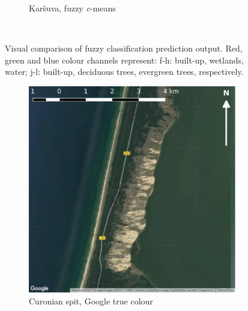 \documentclass[a4paper,12pt]{scrbook}
\begin{document}
\begin{figure}
\begin{subfigure}[t]{.24\textwidth}
    \caption{Kar\v{s}uva, fuzzy \textit{c}-means}
    \label{subfig-karsuva-cm}
  \end{subfigure} \
  \caption{Visual comparison of fuzzy classification prediction output. Red, green and blue colour channels represent: f-h: built-up, wetlands, water; j-l: built-up, deciduous trees, evergreen trees, respectively.}
\end{figure}

\begin{figure}
  \ContinuedFloat
  \centering
  \begin{subfigure}[t]{.24\textwidth}
    \includegraphics[width=\textwidth]{thesis-figures/figures-qgis/kursiunerija-google}
    \caption{Curonian spit, Google true colour}
  \end{subfigure} \hfill
  \begin{subfigure}[t]{.24\textwidth}

\end{subfigure}
\end{figure}
\end{document}
